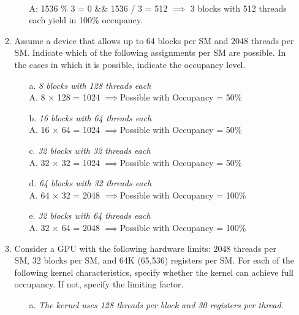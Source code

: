 \begin{enumerate}
\begin{enumerate}
\begin{itemize}
                              \\
                              \linebreak
                              A: 1536 \% 3 = 0 \&\& 1536 / 3 = 512 \(\implies\) 3 blocks with 512 threads each yield in 100\% occupancy.
                    \end{itemize}
              \item Assume a device that allows up to 64 blocks per SM and 2048 threads per SM. Indicate which of the following assignments per SM are possible. In the cases in which it is possible, indicate the occupancy level.
                    \begin{itemize}
                        \item[a.] \textsl{8 blocks with 128 threads each}
                              \\A. 8 \(\times\) 128 = 1024 \(\implies\)Possible with Occupancy = 50\%
                        \item[b.] \textsl{16 blocks with 64 threads each}
                              \\A. 16 \(\times\) 64 = 1024 \(\implies\)Possible with Occupancy = 50\%
                        \item[c.] \textsl{32 blocks with 32 threads each}
                              \\A. 32 \(\times\) 32 = 1024 \(\implies\)Possible with Occupancy = 50\%
                        \item[d.] \textsl{64 blocks with 32 threads each}
                              \\A. 64 \(\times\) 32 = 2048 \(\implies\)Possible with Occupancy = 100\%
                        \item[e.] \textsl{32 blocks with 64 threads each}
                              \\A. 32 \(\times\) 64 = 2048 \(\implies\)Possible with Occupancy = 100\%
                    \end{itemize}
              \item Consider a GPU with the following hardware limits: 2048 threads per SM, 32 blocks per SM, and 64K (65,536) registers per SM. For each of the following kernel characteristics, specify whether the kernel can achieve full occupancy. If not, specify the limiting factor.
                    \begin{itemize}
                        \item[a.]
                              \textsl{The kernel uses 128 threads per block and 30 registers per thread.}

\end{itemize}
\end{enumerate}
\end{enumerate}
